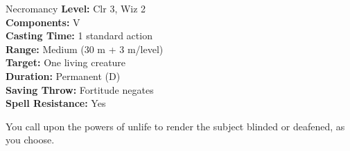 {Necromancy}
{
	\textbf{Level:}
	Clr 3, Wiz 2\\
	\textbf{Components:}
	V\\
	\textbf{Casting Time:}
	1 standard action\\
	\textbf{Range:}
	Medium (30 m + 3 m/level)\\
	\textbf{Target:}
	One living creature\\
	\textbf{Duration:}
	Permanent (D)\\
	\textbf{Saving Throw:}
	Fortitude negates\\
	\textbf{Spell Resistance:}
	Yes\\
}
{
	You call upon the powers of unlife to render the subject blinded or deafened, as you choose.

}
